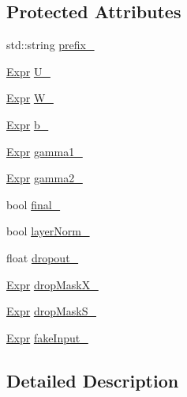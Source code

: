 \subsection*{Protected Attributes}
\begin{DoxyCompactItemize}
\item 
std\+::string \hyperlink{classmarian_1_1rnn_1_1GRU_a55a1c802bb9f2c757ba99c50390def07}{prefix\+\_\+}
\item 
\hyperlink{namespacemarian_a498d8baf75b754011078b890b39c8e12}{Expr} \hyperlink{classmarian_1_1rnn_1_1GRU_a3e2ad5f403491468b529e60a95be47d2}{U\+\_\+}
\item 
\hyperlink{namespacemarian_a498d8baf75b754011078b890b39c8e12}{Expr} \hyperlink{classmarian_1_1rnn_1_1GRU_ab1d7208cfab36cde27cf922b197a6314}{W\+\_\+}
\item 
\hyperlink{namespacemarian_a498d8baf75b754011078b890b39c8e12}{Expr} \hyperlink{classmarian_1_1rnn_1_1GRU_a6dc536e4a1f4803a83114a91c26dd8e4}{b\+\_\+}
\item 
\hyperlink{namespacemarian_a498d8baf75b754011078b890b39c8e12}{Expr} \hyperlink{classmarian_1_1rnn_1_1GRU_a3902f55b7d37e9a57600508206ce95a3}{gamma1\+\_\+}
\item 
\hyperlink{namespacemarian_a498d8baf75b754011078b890b39c8e12}{Expr} \hyperlink{classmarian_1_1rnn_1_1GRU_a24fd026dbc09e0367d4c05a6cae91a3e}{gamma2\+\_\+}
\item 
bool \hyperlink{classmarian_1_1rnn_1_1GRU_ac67ae752da2dac75c13d462dffff70ba}{final\+\_\+}
\item 
bool \hyperlink{classmarian_1_1rnn_1_1GRU_af4559f4e35983ef5c4b228ca251f544c}{layer\+Norm\+\_\+}
\item 
float \hyperlink{classmarian_1_1rnn_1_1GRU_ad5dec297676453431349eb1509a215cf}{dropout\+\_\+}
\item 
\hyperlink{namespacemarian_a498d8baf75b754011078b890b39c8e12}{Expr} \hyperlink{classmarian_1_1rnn_1_1GRU_a383afe82e0b8032f88bb27f192b6340c}{drop\+Mask\+X\+\_\+}
\item 
\hyperlink{namespacemarian_a498d8baf75b754011078b890b39c8e12}{Expr} \hyperlink{classmarian_1_1rnn_1_1GRU_a8ccd8c5d684a9010dca0f38701dcc9fd}{drop\+Mask\+S\+\_\+}
\item 
\hyperlink{namespacemarian_a498d8baf75b754011078b890b39c8e12}{Expr} \hyperlink{classmarian_1_1rnn_1_1GRU_a36b23aff77b532d5fcb63fce62f8d9f5}{fake\+Input\+\_\+}
\end{DoxyCompactItemize}


\subsection{Detailed Description}



